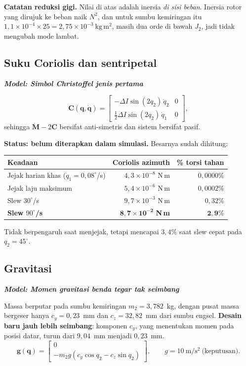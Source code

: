 \documentclass[11pt,a4paper]{article}
\newcommand{\degg}{^\circ}
\newcommand{\model}[1]{\textbf{\textit{Model: #1}}}
\begin{document}
\textbf{Catatan reduksi gigi.} Nilai di atas adalah inersia \emph{di sisi beban}. Inersia rotor yang
dirujuk ke beban naik $N^2$, dan untuk sumbu kemiringan itu $1{,}1\times10^{-4} \times 25 = 2{,}75\times
10^{-3} \ \mathrm{kg\,m^2}$, masih dua orde di bawah $J_2$, jadi tidak mengubah mode lambat.

\subsection{Suku Coriolis dan sentripetal}

\model{Simbol Christoffel jenis pertama}

\begin{equation}
\bm{C}(\bm{q},\dot{\bm{q}}) =
\begin{bmatrix}
-\Delta I \sin(2q_2)\,\dot{q}_2 & 0 \\[2pt]
\tfrac{1}{2}\Delta I \sin(2q_2)\,\dot{q}_1 & 0
\end{bmatrix},
\end{equation}
sehingga $\dot{\bm{M}} - 2\bm{C}$ bersifat anti-simetris dan sistem bersifat pasif.

\textbf{Status: belum diterapkan dalam simulasi.} Besarnya sudah dihitung:

\begin{longtable}{p{6.4cm} r r}
\toprule
\textbf{Keadaan} & \textbf{Coriolis azimuth} & \textbf{\% torsi tahan} \\
\midrule
Jejak harian khas ($\dot q_1 = 0{,}08\degg$/s) & $4{,}3\times10^{-8}$ N\,m & $0{,}0000\%$ \\
Jejak laju maksimum & $5{,}4\times10^{-6}$ N\,m & $0{,}0002\%$ \\
Slew $30\degg$/s & $9{,}7\times10^{-3}$ N\,m & $0{,}32\%$ \\
\textbf{Slew $90\degg$/s} & $\bm{8{,}7\times10^{-2}}$ \textbf{N\,m} & $\bm{2{,}9\%}$ \\
\bottomrule
\end{longtable}

Tidak berpengaruh saat menjejak, tetapi mencapai $3{,}4\%$ saat slew cepat pada $q_2 = 45\degg$.

\subsection{Gravitasi}

\model{Momen gravitasi benda tegar tak seimbang}

Massa berputar pada sumbu kemiringan $m_2 = 3{,}782$~kg, dengan pusat massa bergeser hanya
$c_y = 0{,}23$~mm dan $c_z = 32{,}82$~mm dari sumbu engsel. \textbf{Desain baru jauh lebih seimbang}:
komponen $c_y$, yang menentukan momen pada posisi datar, turun dari $9{,}04$~mm menjadi $0{,}23$~mm.
\begin{equation}
\bm{g}(\bm{q}) = \begin{bmatrix} 0 \\ -m_2 g \left( c_y \cos q_2 - c_z \sin q_2 \right) \end{bmatrix},
\qquad g = 10 \ \mathrm{m/s^2} \ \text{(keputusan)}.
\label{eq:grav}
\end{equation}
\end{document}
